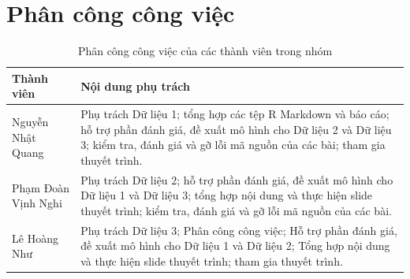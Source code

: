\clearpage
\section*{Phân công công việc}

\begin{table}[H]
\centering
\caption{Phân công công việc của các thành viên trong nhóm}
\label{tab:team-assignment}
\begin{tabular}{>{\raggedright\arraybackslash}p{}
                >{\raggedright\arraybackslash}p{}}
\toprule
\textbf{Thành viên} & \textbf{Nội dung phụ trách} \\
\midrule
Nguyễn Nhật Quang &
Phụ trách Dữ liệu 1; tổng hợp các tệp R Markdown và báo cáo; hỗ trợ phần
đánh giá, đề xuất mô hình cho Dữ liệu 2 và Dữ liệu 3; kiểm tra, đánh giá
và gỡ lỗi mã nguồn của các bài; tham gia thuyết trình. \\
\addlinespace
Phạm Đoàn Vịnh Nghi &
Phụ trách Dữ liệu 2; hỗ trợ phần đánh giá, đề xuất mô hình cho Dữ liệu 1
và Dữ liệu 3; tổng hợp nội dung và thực hiện slide thuyết trình; kiểm
tra, đánh giá và gỡ lỗi mã nguồn của các bài. \\
\addlinespace
Lê Hoàng Như &
Phụ trách Dữ liệu 3; Phân công công việc; Hỗ trợ phần đánh giá, đề xuất mô hình cho Dữ liệu 1 và Dữ liệu 2; Tổng hợp nội dung và thực hiện slide thuyết trình; tham gia thuyết trình. \\
\bottomrule
\end{tabular}
\end{table}